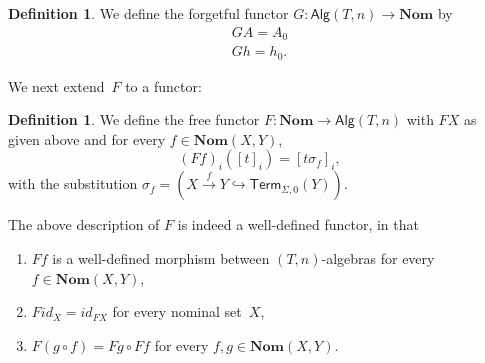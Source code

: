 \documentclass[a4paper,UKenglish,cleveref,thm-restate,numberwithinsect,final]{lipics-v2021}
\newcommand{\Alg}{\mathsf{Alg}}
\newcommand{\Term}{\mathsf{Term}}
\newcommand{\sig}{\Sigma}
\theoremstyle{plain}
\newcommand{\id}{\mathit{id}}
\numberwithin{equation}{section}
\newcommand{\+}[1]{\mathcal{#1}\xspace}
\newcommand{\Nom}{\mathbf{Nom}}
\theoremstyle{definition}
\newtheorem{defn}[theorem]{Definition}
\begin{document}
\begin{defn}\label{def:forgetfulfunctor}
    We define the forgetful functor \(G: \Alg(T, n) \to \Nom\) by
    \begin{gather*}
        GA = A_0 \\
        Gh = h_0.
    \end{gather*}
\end{defn}
\noindent We next extend~$F$ to a functor:
\begin{defn}\label{def:freefunctor}
    We define the free functor \(F\colon \Nom \to \Alg(T, n)\) with \(FX\) as given above and for every \(f \in \Nom(X, Y)\),
    \[
        (Ff)_i([t]_i) = [t\sigma_f]_i,
    \]
    with the substitution \(\sigma_f = (X \xrightarrow{f} Y \hookrightarrow \Term_{\sig, 0}(Y))\).
\end{defn}

\begin{lemma}
    The above description of \(F\) is indeed a well-defined functor, in that
    \begin{enumerate}
        \item \(Ff\) is a well-defined morphism between \((T, n)\)-algebras for every \(f \in \Nom(X, Y)\),
        \item \(F\id_X = \id_{FX}\) for every nominal set~\(X\),
        \item \(F(g \circ f) = Fg \circ Ff\) for every \(f, g \in \Nom(X, Y)\).
    \end{enumerate}
\end{lemma}
\end{document}
